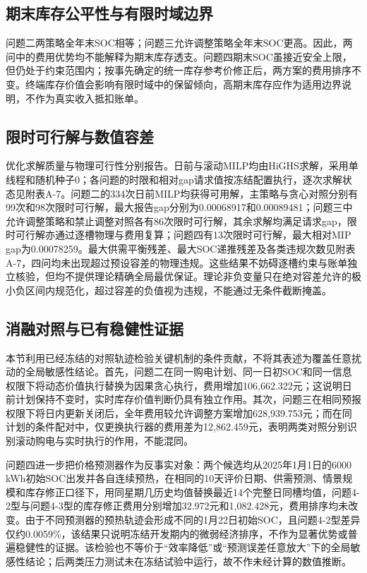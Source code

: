 \documentclass[zihao=-4,a4paper,UTF8,fontset=none]{ctexart}
\begin{document}
\subsection{期末库存公平性与有限时域边界}\label{ux671fux672bux5e93ux5b58ux516cux5e73ux6027ux4e0eux6709ux9650ux65f6ux57dfux8fb9ux754c}

问题二两策略全年末SOC相等；问题三允许调整策略全年末SOC更高。因此，两问中的费用优势均不能解释为期末库存透支。问题四期末SOC虽接近安全上限，但仍处于约束范围内；按事先确定的统一库存参考价修正后，两方案的费用排序不变。终端库存价值会影响有限时域中的保留倾向，高期末库存应作为适用边界说明，不作为真实收入抵扣账单。

\subsection{限时可行解与数值容差}\label{ux9650ux65f6ux53efux884cux89e3ux4e0eux6570ux503cux5bb9ux5dee}

优化求解质量与物理可行性分别报告。日前与滚动MILP均由HiGHS求解，采用单线程和随机种子0；各问题的时限和相对gap请求值按冻结配置执行，逐次求解状态见附表A-7。问题二的334次日前MILP均获得可用解，主策略与贪心对照分别有99次和98次限时可行解，最大报告gap分别为0.00068917和0.00089481；问题三中允许调整策略和禁止调整对照各有86次限时可行解，其余求解均满足请求gap，限时可行解亦通过逐槽物理与费用复算；问题四有13次限时可行解，最大相对MIP gap为0.00078259。最大供需平衡残差、最大SOC递推残差及各类违规次数见附表A-7，四问均未出现超过预设容差的物理违规。这些结果不妨碍逐槽约束与账单独立核验，但均不提供理论精确全局最优保证。理论非负变量只在绝对容差允许的极小负区间内规范化，超过容差的负值视为违规，不能通过无条件截断掩盖。

\subsection{消融对照与已有稳健性证据}\label{ux6d88ux878dux5bf9ux7167ux4e0eux5df2ux6709ux7a33ux5065ux6027ux8bc1ux636e}

本节利用已经冻结的对照轨迹检验关键机制的条件贡献，不将其表述为覆盖任意扰动的全局敏感性结论。首先，问题二在同一购电计划、同一日初SOC和同一信息权限下将动态价值执行替换为因果贪心执行，费用增加106,662.322元；这说明日前计划保持不变时，实时库存价值判断仍具有独立作用。其次，问题三在相同预报权限下将日内更新关闭后，全年费用较允许调整方案增加628,939.753元；而在同计划的条件配对中，仅更换执行器的费用差为12,862.459元，表明两类对照分别识别滚动购电与实时执行的作用，不能混同。

问题四进一步把价格预测器作为反事实对象：两个候选均从2025年1月1日的6000 kWh初始SOC出发并各自连续预热，在相同的10天评价日期、供需预测、情景规模和库存修正口径下，用同星期几历史均值替换最近14个完整日同槽均值，问题4-2型与问题4-3型的库存修正费用分别增加32.972元和1,082.428元，费用排序均未改变。由于不同预测器的预热轨迹会形成不同的1月22日初始SOC，且问题4-2型差异仅约0.0059\%，该结果只说明冻结开发期内的微弱经济排序，不作为显著优势或普遍稳健性的证据。该检验也不等价于``效率降低''或``预测误差任意放大''下的全局敏感性结论；后两类压力测试未在冻结试验中运行，故不作未经计算的数值推断。
\end{document}
